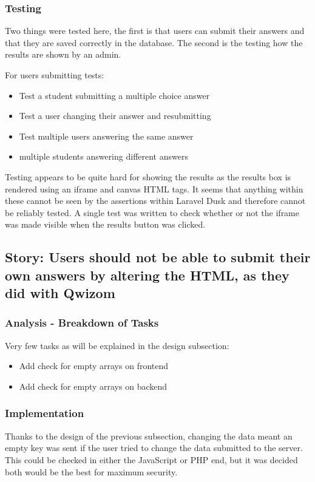 \subsubsection{Testing}
Two things were tested here, the first is that users can submit their answers and that they are saved correctly in the database. The second is the testing how the results are shown by an admin.

For users submitting tests:
\begin{itemize}
	\item Test a student submitting a multiple choice answer
	\item Test a user changing their answer and resubmitting
	\item Test multiple users answering the same answer
	\item multiple students answering different answers
\end{itemize}

Testing appears to be quite hard for showing the results as the results box is rendered using an iframe and canvas HTML tags. It seems that anything within these cannot be seen by the assertions within Laravel Dusk and therefore cannot be reliably tested. A single test was written to check whether or not the iframe was made visible when the results button was clicked.
\newpage

\subsection{Story: Users should not be able to submit their own answers by altering the HTML, as they did with Qwizom}
\subsubsection{Analysis - Breakdown of Tasks}
Very few tasks as will be explained in the design subsection:
\begin{itemize}
	\item Add check for empty arrays on frontend
	\item Add check for empty arrays on backend
\end{itemize}
\subsubsection{Implementation}
Thanks to the design of the previous subsection, changing the data meant an empty key was sent if the user tried to change the data submitted to the server. This could be checked in either the JavaScript or PHP end, but it was decided both would be the best for maximum security. 
